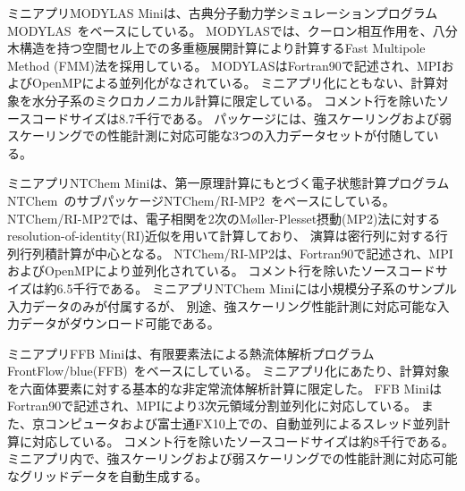 ミニアプリMODYLAS Miniは、古典分子動力学シミュレーションプログラムMODYLAS~\cite{Modylas_url}\cite{Modylas_andoh2013}をベースにしている。
MODYLASでは、クーロン相互作用を、八分木構造を持つ空間セル上での多重極展開計算により計算するFast Multipole Method (FMM)法を採用している。
MODYLASはFortran90で記述され、MPIおよびOpenMPによる並列化がなされている。
ミニアプリ化にともない、計算対象を水分子系のミクロカノニカル計算に限定している。
コメント行を除いたソースコードサイズは8.7千行である。
パッケージには、強スケーリングおよび弱スケーリングでの性能計測に対応可能な3つの入力データセットが付随している。

ミニアプリNTChem Miniは、第一原理計算にもとづく電子状態計算プログラムNTChem~\cite{NTChem_url}のサブパッケージNTChem/RI-MP2~\cite{NTChem_katouda2013}をベースにしている。
NTChem/RI-MP2では、電子相関を2次のM{\o}ller-Plesset摂動(MP2)法に対するresolution-of-identity(RI)近似を用いて計算しており、
演算は密行列に対する行列行列積計算が中心となる。
NTChem/RI-MP2は、Fortran90で記述され、MPIおよびOpenMPにより並列化されている。
コメント行を除いたソースコードサイズは約6.5千行である。
ミニアプリNTChem Miniには小規模分子系のサンプル入力データのみが付属するが、
別途、強スケーリング性能計測に対応可能な入力データがダウンロード可能である。

ミニアプリFFB Miniは、有限要素法による熱流体解析プログラムFrontFlow/blue(FFB)~\cite{FFB_minami2012}\cite{FFB_kumahata2013}をベースにしている。
ミニアプリ化にあたり、計算対象を六面体要素に対する基本的な非定常流体解析計算に限定した。
FFB MiniはFortran90で記述され、MPIにより3次元領域分割並列化に対応している。
また、京コンピュータおよび富士通FX10上での、自動並列によるスレッド並列計算に対応している。
コメント行を除いたソースコードサイズは約8千行である。
ミニアプリ内で、強スケーリングおよび弱スケーリングでの性能計測に対応可能なグリッドデータを自動生成する。

